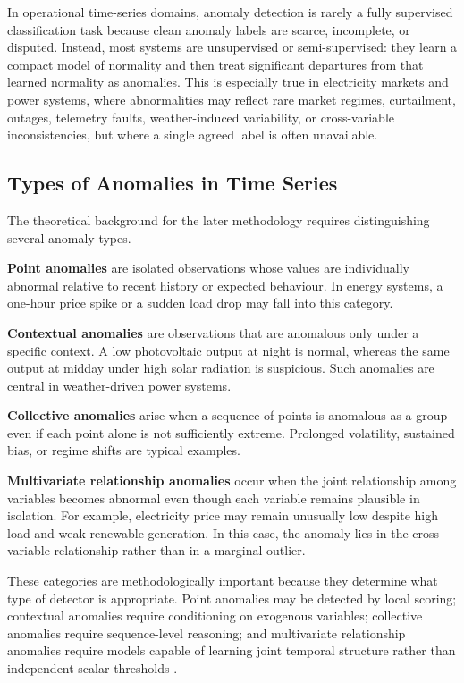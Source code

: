 In operational time-series domains, anomaly detection is rarely a fully supervised classification task because clean anomaly labels are scarce, incomplete, or disputed. Instead, most systems are unsupervised or semi-supervised: they learn a compact model of normality and then treat significant departures from that learned normality as anomalies. This is especially true in electricity markets and power systems, where abnormalities may reflect rare market regimes, curtailment, outages, telemetry faults, weather-induced variability, or cross-variable inconsistencies, but where a single agreed label is often unavailable.

\subsection{Types of Anomalies in Time Series}

The theoretical background for the later methodology requires distinguishing several anomaly types.

\textbf{Point anomalies} are isolated observations whose values are individually abnormal relative to recent history or expected behaviour. In energy systems, a one-hour price spike or a sudden load drop may fall into this category.

\textbf{Contextual anomalies} are observations that are anomalous only under a specific context. A low photovoltaic output at night is normal, whereas the same output at midday under high solar radiation is suspicious. Such anomalies are central in weather-driven power systems.

\textbf{Collective anomalies} arise when a sequence of points is anomalous as a group even if each point alone is not sufficiently extreme. Prolonged volatility, sustained bias, or regime shifts are typical examples.

\textbf{Multivariate relationship anomalies} occur when the joint relationship among variables becomes abnormal even though each variable remains plausible in isolation. For example, electricity price may remain unusually low despite high load and weak renewable generation. In this case, the anomaly lies in the cross-variable relationship rather than in a marginal outlier.

These categories are methodologically important because they determine what type of detector is appropriate. Point anomalies may be detected by local scoring; contextual anomalies require conditioning on exogenous variables; collective anomalies require sequence-level reasoning; and multivariate relationship anomalies require models capable of learning joint temporal structure rather than independent scalar thresholds \cite{chandola2009anomaly,blazquez2021review}.

